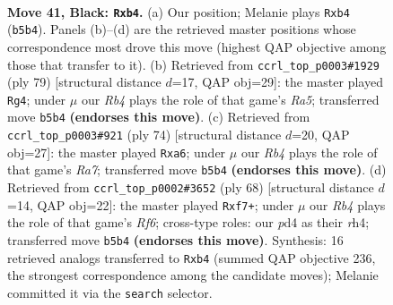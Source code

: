 \documentclass[11pt]{article}
\begin{document}
\clearpage

\begin{figure}[p]\centering
\begin{subfigure}{0.46\textwidth}\centering
\resizebox{\linewidth}{!}{%
\newchessgame
\chessboard[
  setfen={7k/p2p4/2p2p2/1r6/1P1P2K1/8/5P1P/8 b - - 3 41},
  showmover=false,
  pgfstyle=straightmove, color=movearrow, markmove={b5-b4}
]}
\caption{}
\end{subfigure}\hfill
\begin{subfigure}{0.46\textwidth}\centering
\resizebox{\linewidth}{!}{%
\newchessgame
\chessboard[
  setfen={8/p4k2/1pR5/6p1/r7/P3K1P1/1P6/8 b - - 0 40},
  showmover=false,
  pgfstyle=straightmove, color=movearrow, markmove={a4-g4}
]}
\caption{}
\end{subfigure}
\\[4pt]
\begin{subfigure}{0.46\textwidth}\centering
\resizebox{\linewidth}{!}{%
\newchessgame
\chessboard[
  setfen={5k2/R7/p3p1p1/P6p/r7/4K1P1/7P/8 w - - 4 38},
  showmover=false,
  pgfstyle=straightmove, color=movearrow, markmove={a7-a6}
]}
\caption{}
\end{subfigure}\hfill
\begin{subfigure}{0.46\textwidth}\centering
\resizebox{\linewidth}{!}{%
\newchessgame
\chessboard[
  setfen={8/3k1p2/pp3R2/4p1P1/P6r/8/1PP5/6K1 w - - 1 35},
  showmover=false,
  pgfstyle=straightmove, color=movearrow, markmove={f6-f7}
]}
\caption{}
\end{subfigure}
\caption{\textbf{Move 41, Black: \texttt{Rxb4}.} (a) Our position; Melanie plays \texttt{Rxb4} (\texttt{b5b4}). Panels (b)--(d) are the retrieved master positions whose correspondence most drove this move (highest QAP objective among those that transfer to it). (b) Retrieved from \texttt{ccrl\_top\_p0003\#1929} (ply 79) [structural distance $d$=17, QAP obj=29]: the master played \texttt{Rg4}; under $\mu$ our \emph{Rb4} plays the role of that game's \emph{Ra5}; transferred move \texttt{b5b4} \textbf{(endorses this move)}. (c) Retrieved from \texttt{ccrl\_top\_p0003\#921} (ply 74) [structural distance $d$=20, QAP obj=27]: the master played \texttt{Rxa6}; under $\mu$ our \emph{Rb4} plays the role of that game's \emph{Ra7}; transferred move \texttt{b5b4} \textbf{(endorses this move)}. (d) Retrieved from \texttt{ccrl\_top\_p0002\#3652} (ply 68) [structural distance $d$=14, QAP obj=22]: the master played \texttt{Rxf7+}; under $\mu$ our \emph{Rb4} plays the role of that game's \emph{Rf6}; cross-type roles: our \emph{p}d4 as their \emph{r}h4; transferred move \texttt{b5b4} \textbf{(endorses this move)}. Synthesis: 16 retrieved analogs transferred to \texttt{Rxb4} (summed QAP objective 236, the strongest correspondence among the candidate moves); Melanie committed it via the \texttt{search} selector.}
\label{fig:thought-m81}
\end{figure}
\end{document}

